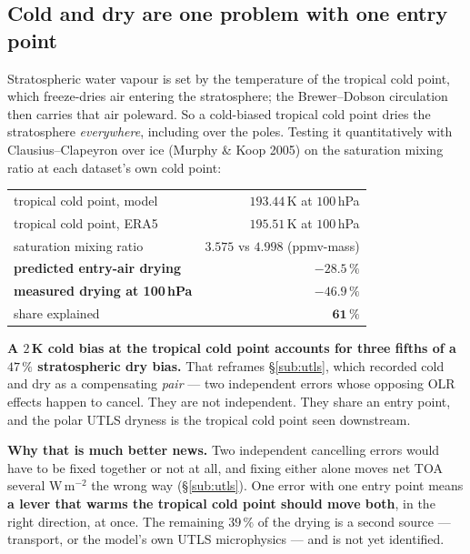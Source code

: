 \documentclass[10pt]{article}
\begin{document}
\subsection{Cold and dry are one problem with one entry point}\label{sub:r25onecause}
Stratospheric water vapour is set by the temperature of the tropical cold point, which
freeze-dries air entering the stratosphere; the Brewer--Dobson circulation then carries that
air poleward. So a cold-biased tropical cold point dries the stratosphere \emph{everywhere},
including over the poles. Testing it quantitatively with Clausius--Clapeyron over ice
(Murphy \& Koop 2005) on the saturation mixing ratio at each dataset's own cold point:

\begin{center}\footnotesize
\begin{tabular}{l r}
\toprule
tropical cold point, model & $193.44$\,K at $100$\,hPa \\
tropical cold point, ERA5 & $195.51$\,K at $100$\,hPa \\
saturation mixing ratio & $3.575$ vs $4.998$ (ppmv-mass) \\
\midrule
\textbf{predicted entry-air drying} & $\mathbf{-28.5\,\%}$ \\
\textbf{measured drying at 100\,hPa} & $\mathbf{-46.9\,\%}$ \\
\midrule
share explained & $\mathbf{61\,\%}$ \\
\bottomrule
\end{tabular}
\end{center}

\noindent \textbf{A $2$\,K cold bias at the tropical cold point accounts for three fifths of
a $47\,\%$ stratospheric dry bias.} That reframes \S\ref{sub:utls}, which recorded cold and
dry as a compensating \emph{pair} --- two independent errors whose opposing OLR effects
happen to cancel. They are not independent. They share an entry point, and the polar UTLS
dryness is the tropical cold point seen downstream.

\textbf{Why that is much better news.} Two independent cancelling errors would have to be
fixed together or not at all, and fixing either alone moves net TOA several W\,m$^{-2}$ the
wrong way (\S\ref{sub:utls}). One error with one entry point means \textbf{a lever that warms
the tropical cold point should move both}, in the right direction, at once. The remaining
$39\,\%$ of the drying is a second source --- transport, or the model's own UTLS
microphysics --- and is not yet identified.
\end{document}
